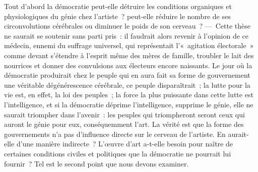 \documentclass[french,twoside]{book} %
\begin{document}
Tout d’abord la démocratie peut-elle détruire les conditions organiques et physiologiques du génie chez l’artiste ? peut-elle réduire le nombre de ses circonvolutions cérébrales ou diminuer le poids de son cerveau ? — Cette thèse ne saurait se soutenir sans parti pris : il faudrait alors revenir à l’opinion de ce médecin, ennemi du suffrage universel, qui représentait l’« agitation électorale » comme devant s’étendre à l’esprit même des mères de famille, troubler le lait des nourrices et donner des convulsions aux électeurs encore naissants. Le jour où la démocratie produirait chez  le peuple qui en aura fait sa forme de gouvernement une véritable dégénérescence cérébrale, ce peuple disparaîtrait ; la lutte pour la vie est, en effet, la loi des peuples ; la force la plus puissante dans cette lutte est l’intelligence, et si la démocratie déprime l’intelligence, supprime le génie, elle ne saurait triompher dans l’avenir : les peuples qui triompheront seront ceux qui auront le génie pour eux, conséquemment l’art. La vérité est que la forme des gouvernements n’a pas d’influence directe sur le cerveau de l’artiste. En aurait-elle d’une manière indirecte ? L’œuvre d’art a-t-elle besoin pour naître de certaines conditions civiles et politiques que la démocratie ne pourrait lui fournir ? Tel est le second point que nous devons examiner.\par
\end{document}
